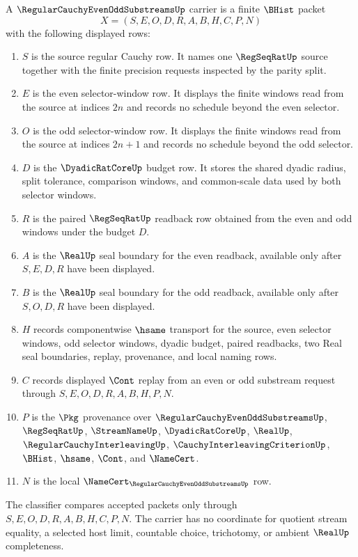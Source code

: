 \begin{definition}
\label{def:regular-cauchy-even-odd-substreams-carrier}
A $\RegularCauchyEvenOddSubstreamsUp$ carrier is a finite $\BHist$ packet
$$
X=(S,E,O,D,R,A,B,H,C,P,N)
$$
with the following displayed rows:
\begin{enumerate}
\item $S$ is the source regular Cauchy row. It names one $\RegSeqRatUp$ source together with the finite precision requests inspected by the parity split.
\item $E$ is the even selector-window row. It displays the finite windows read from the source at indices $2n$ and records no schedule beyond the even selector.
\item $O$ is the odd selector-window row. It displays the finite windows read from the source at indices $2n+1$ and records no schedule beyond the odd selector.
\item $D$ is the $\DyadicRatCoreUp$ budget row. It stores the shared dyadic radius, split tolerance, comparison windows, and common-scale data used by both selector windows.
\item $R$ is the paired $\RegSeqRatUp$ readback row obtained from the even and odd windows under the budget $D$.
\item $A$ is the $\RealUp$ seal boundary for the even readback, available only after $S,E,D,R$ have been displayed.
\item $B$ is the $\RealUp$ seal boundary for the odd readback, available only after $S,O,D,R$ have been displayed.
\item $H$ records componentwise $\hsame$ transport for the source, even selector windows, odd selector windows, dyadic budget, paired readbacks, two Real seal boundaries, replay, provenance, and local naming rows.
\item $C$ records displayed $\Cont$ replay from an even or odd substream request through $S,E,O,D,R,A,B,H,P,N$.
\item $P$ is the $\Pkg$ provenance over $\RegularCauchyEvenOddSubstreamsUp$, $\RegSeqRatUp$, $\StreamNameUp$, $\DyadicRatCoreUp$, $\RealUp$, $\RegularCauchyInterleavingUp$, $\CauchyInterleavingCriterionUp$, $\BHist$, $\hsame$, $\Cont$, and $\NameCert$.
\item $N$ is the local $\NameCert_{\RegularCauchyEvenOddSubstreamsUp}$ row.
\end{enumerate}
The classifier compares accepted packets only through $S,E,O,D,R,A,B,H,C,P,N$. The carrier has no coordinate for quotient stream equality, a selected host limit, countable choice, trichotomy, or ambient $\RealUp$ completeness.
\end{definition}

